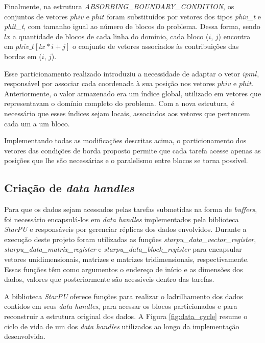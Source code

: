 \documentclass[cic,tc]{iiufrgs}
\begin{document}
Finalmente, na estrutura \textit{ABSORBING\_BOUNDARY\_CONDITION}, os conjuntos de vetores $phiv$ e $phit$ foram substituídos por vetores
dos tipos \textit{phiv\_t} e \textit{phit\_t}, com tamanho igual ao número de blocos do problema. Dessa forma, sendo $lx$ a quantidade
de blocos de cada linha do domínio, cada bloco ($i$, $j$) encontra em $phiv\_t[lx * i + j]$ o conjunto de vetores associados
às contribuições das bordas em ($i$, $j$).

Esse particionamento realizado introduziu a necessidade de adaptar o vetor $ipml$, responsável por associar cada coordenada à sua posição
nos vetores $phiv$ e $phit$. Anteriormente, o valor armazenado era um índice global, utilizado em vetores que representavam o domínio
completo do problema. Com a nova estrutura, é necessário que esses índices sejam locais, associados aos vetores que pertencem cada um a um bloco.

Implementando todas as modificações descritas acima, o particionamento dos vetores das condições de borda proposto permite que cada
tarefa acesse apenas as posições que lhe são necessárias e o paralelismo entre blocos se torna possível.

\subsection{Criação de \textit{data handles}}

Para que os dados sejam acessados pelas tarefas submetidas na forma de \textit{buffers}, foi necessário encapsulá-los em
\textit{data handles} implementados pela biblioteca \textit{StarPU} e responsáveis por gerenciar réplicas dos dados envolvidos.
Durante a execução deste projeto foram utilizadas as funções \textit{starpu\_data\_vector\_register},
\textit{starpu\_data\_matrix\_register} e \textit{starpu\_data\_block\_register} para encapsular vetores unidimensionais, matrizes e matrizes tridimensionais, respectivamente.
Essas funções têm como argumentos o endereço de início e as dimensões dos dados, valores que posteriormente são acessíveis dentro das tarefas.

A biblioteca \textit{StarPU} oferece funções para realizar o ladrilhamento dos dados contidos em seus \textit{data handles}, para acessar
os blocos particionados e para reconstruir a estrutura original dos dados. A Figura \ref{fig:data_cycle} resume o ciclo de vida de um dos
\textit{data handles} utilizados ao longo da implementação desenvolvida.
\end{document}
